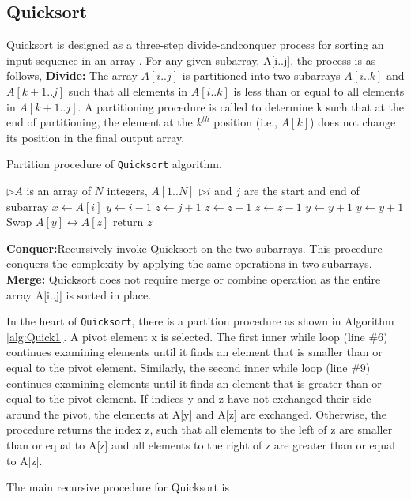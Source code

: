 \documentclass[10pt]{article}
\begin{document}
\begin{multicols*}{2}
\section{Quicksort}
Quicksort is designed as a three-step divide-andconquer
process for sorting an input sequence in
an array \cite{cormen2009introduction}. For any given subarray, A[i..j], the process is as follows, \newline
\textbf{Divide:} The array $A[i..j]$ is partitioned into two
subarrays $A[i..k]$ and $A[k + 1..j]$ such that all elements
in $A[i..k]$ is less than or equal to all elements
in $A[k + 1..j]$. A partitioning procedure is called to
determine k such that at the end of partitioning,
the element at the $k^{th}$ position (i.e., $A[k]$) does not
change its position in the final output array.

\begin{algorithm}[H]
\caption{ Partition procedure of \texttt{Quicksort} 
algorithm.}\label{alg:Quick1}
\begin{algorithmic}[1]
\State \(\triangleright\)$A$ is an array of $N$ integers, $A[1..N]$
\State \(\triangleright\)$i$ and $j$ are the start and end of subarray
\State $x\gets A[i]$
\State $y\gets i-1$
\State $z\gets j+1$
\State $z\gets z - 1$
    	\State $z\gets z - 1$
    \EndWhile%
\State $y\gets y+1$
    	\State $y\gets y + 1$
    \EndWhile
    	\State Swap $A[y] \leftrightarrow A[z]$
    \Else
    	\State return $z$ 
    \EndIf
\EndWhile%
\EndProcedure
\end{algorithmic}
\end{algorithm}

\textbf{Conquer:}Recursively invoke Quicksort on the
two subarrays. This procedure conquers the complexity
by applying the same operations in two subarrays.\newline
\textbf{Merge:} Quicksort does not require merge or combine
operation as the entire array A[i..j] is sorted
in place.
\par
In the heart of \texttt{Quicksort}, there is a partition
procedure as shown in Algorithm \ref{alg:Quick1}. A pivot element
x is selected. The first inner while loop (line
$\#6$) continues examining elements until it finds an
element that is smaller than or equal to the pivot element.
Similarly, the second inner while loop (line
$\#9$) continues examining elements until it finds an
element that is greater than or equal to the pivot
element. If indices y and z have not exchanged
their side around the pivot, the elements at A[y]
and A[z] are exchanged. Otherwise, the procedure
returns the index z, such that all elements to the
left of z are smaller than or equal to A[z] and all
elements to the right of z are greater than or equal
to A[z].\par
The main recursive procedure for Quicksort is 


\end{multicols*}
\end{document}
